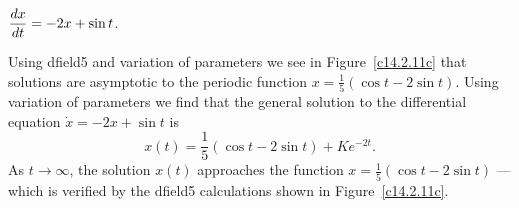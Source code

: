 \documentclass{ximera}
\begin{document}
\begin{computerExercise}   \label{c14.2.11c}
$\displaystyle\frac{dx}{dt} = -2 x + \sin t$.

\begin{solution}

Using {\sf dfield5} and variation of parameters we see in 
Figure~\ref{c14.2.11c} that solutions are asymptotic to the
periodic function $x=\frac{1}{5}(\cos t-2\sin t)$.
Using variation of parameters we find that the general solution to the
differential equation $\dot{x}=-2x+\sin t$ is 
\[
x(t) = \frac{1}{5}(\cos t-2\sin t) + Ke^{-2t}.
\]
As $t\to\infty$, the solution $x(t)$ approaches the function  
$x= \frac{1}{5}(\cos t-2\sin t)$ --- which is verified by the 
{\sf dfield5} calculations shown in Figure~\ref{c14.2.11c}.

\begin{figure}[htb]
     \centerline{%
     }
\end{figure} 



\end{solution}
\end{computerExercise}
\end{document}
